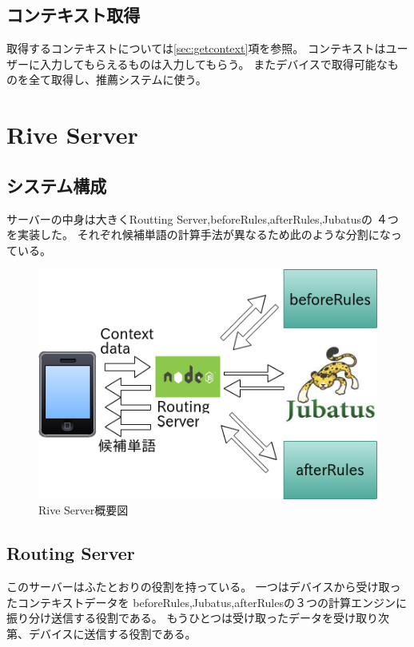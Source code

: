 \subsection{コンテキスト取得}

取得するコンテキストについては\ref{sec:getcontext}項を参照。
コンテキストはユーザーに入力してもらえるものは入力してもらう。
またデバイスで取得可能なものを全て取得し、推薦システムに使う。

\section{Rive Server}
\subsection{システム構成}

サーバーの中身は大きくRoutting Server,beforeRules,afterRules,Jubatusの
４つを実装した。
それぞれ候補単語の計算手法が異なるため此のような分割になっている。
\begin{figure}[htbp]
  \begin{center}
    \includegraphics[width=14cm,bb=0 0 466 316]{images/riveserver.png}
  \end{center}
  \caption{Rive Server概要図}
  \label{fig:riveserver}
\end{figure}

\subsection{Routing Server}
このサーバーはふたとおりの役割を持っている。
一つはデバイスから受け取ったコンテキストデータを
beforeRules,Jubatus,afterRulesの３つの計算エンジンに振り分け送信する役割である。
もうひとつは受け取ったデータを受け取り次第、デバイスに送信する役割である。

